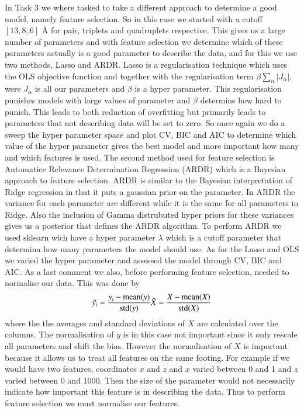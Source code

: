 \documentclass[11pt,a4paper]{article}
\begin{document}
In Task 3 we where tasked to take a different approach to determine a good model, namely feature selection. So in this case we started with a cutoff $[13, 8, 6]$ Å for pair, triplets and quadruplets respective. This gives us a large number of parameters and with feature selection we determine which of these parameters actually is a good parameter to describe the data, and for this we use two methods, Lasso and ARDR.  Lasso is a regularisation technique which uses the OLS objective function and together with the regularisation term $\beta \sum_\alpha |J_\alpha|$, were $J_\alpha$ is all our parameters and $\beta$ is a hyper parameter. This regularisation punishes models with large values of parameter and $\beta$ determins how hard to punish. This leads to both reduction of overfitting but primarily leads to parameters that not describing data will be set to zero. So once again we do a sweep the hyper parameter space and plot CV, BIC and AIC to determine which value of the hyper parameter gives the best model and more important how many and which features is used. The second method used for feature selection is Automatice Relevance Determination Regression (ARDR) which is a Bayesian approach to feature selection. ARDR is similar to the Bayesian interpretation of Ridge regression in that it puts a gaussian prior on the parameter. In ARDR the variance for each parameter are different while it is the same for all parameters in Ridge. Also the inclusion of Gamma distrubuted hyper priors for these variances gives us a posterior that defines the ARDR algorithm. To perform ARDR we used sklearn wich have a hyper parameter $\lambda$ which is a cutoff parameter that determina how many parameters the model should use. As for the Lasso and OLS we varied the hyper parameter and assessed the model through CV, BIC and AIC. As a last comment we also, before performing feature selection, needed to normalise our data. This was done by 
\begin{equation*}
    \Tilde{y_i} = \frac{y_i - \text{mean}(y)}{\text{std}(y)}
    \Tilde{X} = \frac{X - \text{mean}(X)}{\text{std}(X)}
\end{equation*}
where the the averages and standard deviations of $X$ are calculated over the columns. The normalisation of $y$ is in this case not important since it only rescale all parameters and shift the bias. However the normalisation of $X$ is important because it allows us to treat all features on the same footing. For example if we would have two features, coordinates $x$ and $z$ and $x$ varied between 0 and 1 and $z$ varied between 0 and 1000. Then the size of the parameter would not necessarily indicate how important this feature is in describing the data. Thus to perform feature selection we must normalise our features. 
\end{document}
